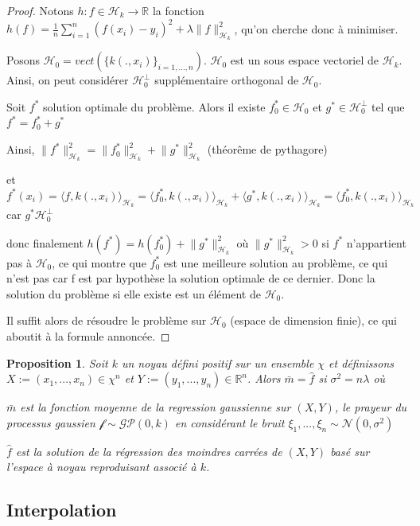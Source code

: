 \documentclass[a4paper,12pt]{article}
\newtheorem{proposition}{Proposition}
\begin{document}
\begin{proof}
Notons $h:f\in\mathcal{H}_k\to\mathbb{R}$ la fonction $h(f)=\frac{1}{n}\sum_{i=1}^n(f(x_i)-y_i)^2+\lambda\lVert f\rVert_{\mathcal{H}_k}^2$, qu'on cherche donc à minimiser.

Posons $\mathcal{H}_0=vect(\{k(.,x_i)\}_{i=1,...,n})$. $\mathcal{H}_0$ est un sous espace vectoriel de $\mathcal{H}_k$. Ainsi, on peut considérer $\mathcal{H}_0^\perp$ supplémentaire orthogonal de $\mathcal{H}_0$. 

Soit $f^*$ solution optimale du problème. Alors il existe $f^*_0\in\mathcal{H}_0$ et $g^*\in\mathcal{H}_0^\perp$ tel que $f^*=f^*_0+g^*$

Ainsi, $\lVert f^*\rVert_{\mathcal{H}_k}^2=\lVert f^*_0\rVert_{\mathcal{H}_k}^2+\lVert g^*\rVert_{\mathcal{H}_k}^2$ (théorême de pythagore)

et $f^*(x_i)=\langle f,k(.,x_i)\rangle_{\mathcal{H}_k}=\langle f^*_0,k(.,x_i)\rangle_{\mathcal{H}_k}+\langle g^*,k(.,x_i)\rangle_{\mathcal{H}_k}=\langle f^*_0,k(.,x_i)\rangle_{\mathcal{H}_k}$ car $g^*\mathcal{H}_0^\perp$

donc finalement $h(f^*)=h(f^*_0)+\lVert g^*\rVert_{\mathcal{H}_k}^2$ où $\lVert g^*\rVert_{\mathcal{H}_k}^2 >0$ si $f^*$ n'appartient pas à $\mathcal{H}_0$, ce qui montre que $f^*_0$ est une meilleure solution au problème, ce qui n'est pas car f est par hypothèse la solution optimale de ce dernier. Donc la solution du problème si elle existe est un élément de $\mathcal{H}_0$.

Il suffit alors de résoudre le problème sur $\mathcal{H}_0$ (espace de dimension finie), ce qui aboutit à la formule annoncée.
\end{proof}

\begin{proposition}
    Soit $k$ un noyau défini positif sur un ensemble $\chi$ et définissons $X:=(x_1,...,x_n)\in\chi^n$ et $Y:=(y_1,...,y_n)\in\mathbb{R}^n$. Alors $\bar{m}=\hat{f}$ si $\sigma^2=n\lambda$ où

$\bar{m}$ est la fonction moyenne de la regression gaussienne sur $(X,Y)$, le prayeur du processus gaussien $\mathcal{f}\sim\mathcal{GP}(0,k)$ en considérant le bruit $\xi_1,...,\xi_n\sim\mathcal{N}(0,\sigma^2)$

$\hat{f}$ est la solution de la régression des moindres carrées de $(X,Y)$ basé sur l'espace à noyau reproduisant associé à $k$.
\end{proposition}

\subsection{Interpolation}
\end{document}
